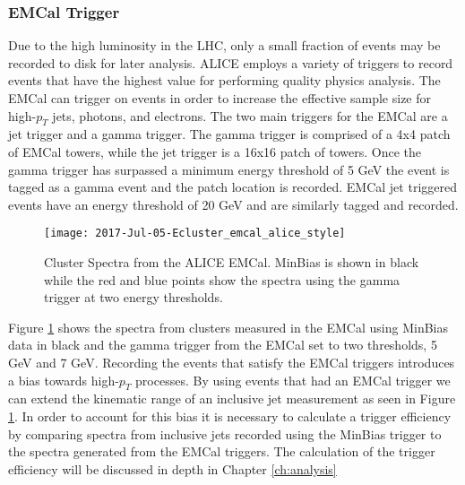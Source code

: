 \subsubsection{EMCal Trigger}


Due to the high luminosity in the LHC, only a small fraction of events may be recorded to disk for later analysis.  ALICE employs a variety of triggers to record events that have the highest value for performing quality physics analysis.  The EMCal can trigger on events in order to increase the effective sample size for high-$p_{T}$ jets, photons, and electrons.  The two main triggers\cite{bourrion2010level}\cite{bourrion2013alice} for the EMCal are a jet trigger and a gamma trigger.  The gamma trigger is comprised of a 4x4 patch of EMCal towers, while the jet trigger is a 16x16 patch of towers.  Once the gamma trigger has surpassed a minimum energy threshold of 5 GeV\cite{Kral2012261} the event is tagged as a gamma event and the patch location is recorded.  EMCal jet triggered events have an energy threshold of 20 GeV and are similarly tagged and recorded. 

\begin{figure}[h]
\texttt{[image: 2017-Jul-05-Ecluster\_emcal\_alice\_style]}
\centering
\caption{Cluster Spectra from the ALICE EMCal.  MinBias is shown in black while the red and blue points show the spectra using the gamma trigger at two energy thresholds\cite{Jahnke:2018mrq}.}
\label{fig:EMCalSpectra}
\end{figure}

Figure \ref{fig:EMCalSpectra} shows the spectra from clusters measured in the EMCal using MinBias data in black and the gamma trigger from the EMCal set to two thresholds, 5 GeV and 7 GeV.  Recording the events that satisfy the EMCal triggers introduces a bias towards high-$p_{T}$ processes.  By using events that had an EMCal trigger we can extend the kinematic range of an inclusive jet measurement as seen in Figure \ref{fig:EMCalSpectra}.  In order to account for this bias it is necessary to calculate a trigger efficiency by comparing spectra from inclusive jets recorded using the MinBias trigger to the spectra generated from the EMCal triggers.  The calculation of the trigger efficiency will be discussed in depth in Chapter \ref{ch:analysis}